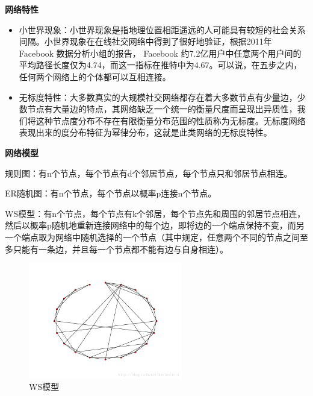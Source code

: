 \begin{frame}
	\textbf{网络特性}
	
	\begin{itemize}
		\item 小世界现象：小世界现象是指地理位置相距遥远的人可能具有较短的社会关系间隔。小世界现象在在线社交网络中得到了很好地验证，根据2011年 Facebook 数据分析小组的报告， Facebook 约7.2亿用户中任意两个用户间的平均路径长度仅为4.74，而这一指标在推特中为4.67。可以说，在五步之内，任何两个网络上的个体都可以互相连接。
		
		\item 无标度特性：大多数真实的大规模社交网络都存在着大多数节点有少量边，少数节点有大量边的特点，其网络缺乏一个统一的衡量尺度而呈现出异质性，我们将这种节点度分布不存在有限衡量分布范围的性质称为无标度。无标度网络表现出来的度分布特征为幂律分布，这就是此类网络的无标度特性。
	\end{itemize}

\end{frame}

\begin{frame}
	\textbf{网络模型}
	
	规则图：有n个节点，每个节点有d个邻居节点，每个节点只和邻居节点相连。
	
	ER随机图：有n个节点，每个节点以概率p连接n个节点。
\end{frame}

\begin{frame}
	WS模型：有n个节点，每个节点有k个邻居，每个节点先和周围的邻居节点相连，然后以概率p随机地重新连接网络中的每个边，即将边的一个端点保持不变，而另一个端点取为网络中随机选择的一个节点（其中规定，任意两个不同的节点之间至多只能有一条边，并且每一个节点都不能有边与自身相连）。
	\begin{figure}[htbp]
		\centering
		\includegraphics[width=0.6\textwidth]{pic/WS.png}
		\caption{WS模型}
	\end{figure}
\end{frame}

